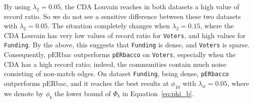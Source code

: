 \documentclass[sigconf, nonacm]{acmart}
\newcommand{\window}{b}
\newcommand{\perbacco}{\texttt{pERbacco}\xspace}
\newcommand{\camera}{\texttt{Camera}\xspace}
\newcommand{\funding}{\texttt{Funding}\xspace}
\newcommand{\voters}{\texttt{Voters}\xspace}
\newcommand{\blue}[1]{\textcolor{blue}{#1}}
\begin{document}
By using $\lambda_2 = 0.05$, the CDA Louvain reaches in both datasets a high value of record ratio. So we do not see a sensitive difference between these two datasets with $\lambda_2 = 0.05$. The situation completely changes when $\lambda_2 = 0.15$, where the CDA Louvain has very low values of record ratio for \voters, and high values for \funding. By the above, this suggests that \funding is dense, and \voters is sparse. Consequently, pERbac outperforms \perbacco on \voters, especially when the CDA has a high record ratio; indeed, the communities contain much noise consisting of non-match edges. On dataset \funding, being dense, \perbacco outperforms pERbac, and it reaches the best results at $\phi_{10}$ with $\lambda_w = 0.05$, where we denote by $\phi_b$ the lower bound of $\Phi_b$ in Equation~\ref{eq:phi_b}.





\end{document}
